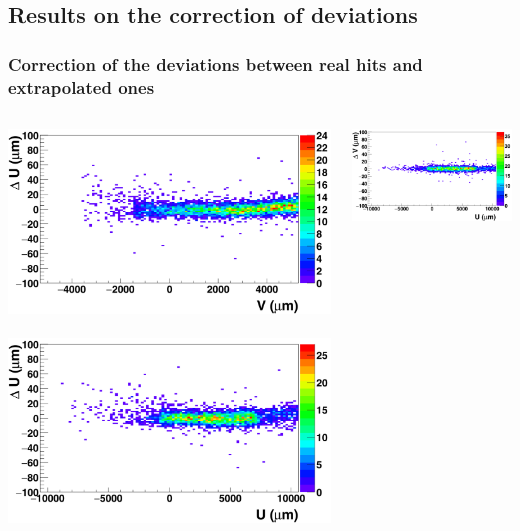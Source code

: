\documentclass{beamer}
\begin{document}
\subsection{Results on the correction of deviations}
\begin{frame}
  \frametitle{Correction of the deviations between real hits and extrapolated ones}

  \vspace{-0.35cm}
  \begin{center}
    \begin{columns}[t]
      \begin{column}{4cm}
        \centering
        \includegraphics[width = 1.2\textwidth]{Pictures/deltaUV_8_corrected1.png}
        \
        \includegraphics[width = 1.2\textwidth]{Pictures/deltaUU_8_corrected1.png}
      \end{column}
      \begin{column}{4cm}
        \centering
        \includegraphics[width = 1.2\textwidth]{Pictures/deltaVU_8_corrected1.png}

\end{column}
\end{columns}
\end{center}
\end{frame}
\end{document}
